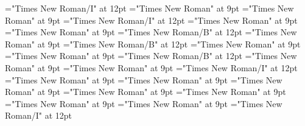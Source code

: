 \documentclass[gps1,twoside]{article}
\begin{document}
\font\spanenownertypeabbreviationminimallexreferenceminimallexreferencessubentrysubentriesentry="Times New Roman/I" at 12pt
\font\spanspanownertypeabbreviationminimallexreferenceminimallexreferencessubentrysubentriesentrybefore="Times New Roman" at 9pt
\font\spanownertypeabbreviationminimallexreferenceminimallexreferencessubentrysubentriesentrylastchildafter="Times New Roman" at 9pt
\font\spanownertypeabbreviationminimallexreferenceminimallexreferencessubentrysubentriesentry="Times New Roman/I" at 12pt
\font\configtargetconfigtargetconfigtargetsminimallexreferenceminimallexreferencessubentrysubentriesentrybefore="Times New Roman" at 9pt
\font\configtargetsminimallexreferenceminimallexreferencessubentrysubentriesentryafter="Times New Roman" at 9pt
\font\spanbzhheadwordconfigtargetconfigtargetsminimallexreferenceminimallexreferencessubentrysubentriesentry="Times New Roman/B" at 12pt
\font\spanspanheadwordconfigtargetconfigtargetsminimallexreferenceminimallexreferencessubentrysubentriesentrybefore="Times New Roman" at 9pt
\font\spanheadwordconfigtargetconfigtargetsminimallexreferenceminimallexreferencessubentrysubentriesentry="Times New Roman/B" at 12pt
\font\spanspansensecontentspansensessubentrysubentriesentrybefore="Times New Roman" at 9pt
\font\sensessubentrysubentriesentryafter="Times New Roman" at 9pt
\font\sensenumbersensecontentsensessubentrysubentriesentry="Times New Roman/B" at 12pt
\font\sensenumbersensecontentsensessubentrysubentriesentryafter="Times New Roman" at 9pt
\font\morphosyntaxanalysissharedgrammaticalinfosensessubentrysubentriesentryafter="Times New Roman" at 9pt
\font\morphosyntaxanalysissharedgrammaticalinfosensessubentrysubentriesentry="Times New Roman/I" at 12pt
\font\spanspanpartofspeechmorphosyntaxanalysissharedgrammaticalinfosensessubentrysubentriesentrybefore="Times New Roman" at 9pt
\font\spanpartofspeechmorphosyntaxanalysissharedgrammaticalinfosensessubentrysubentriesentrylastchildafter="Times New Roman" at 9pt
\font\spanspanslotsmorphosyntaxanalysissharedgrammaticalinfosensessubentrysubentriesentrybefore="Times New Roman" at 9pt
\font\slotsmorphosyntaxanalysissharedgrammaticalinfosensessubentrysubentriesentrybefore="Times New Roman" at 9pt
\font\spanspannameslotslotsmorphosyntaxanalysissharedgrammaticalinfosensessubentrysubentriesentrybefore="Times New Roman" at 9pt
\font\spannameslotslotsmorphosyntaxanalysissharedgrammaticalinfosensessubentrysubentriesentrylastchildafter="Times New Roman" at 9pt
\font\morphosyntaxanalysissensesensessubentrysubentriesentryafter="Times New Roman" at 9pt
\font\morphosyntaxanalysissensesensessubentrysubentriesentry="Times New Roman/I" at 12pt
\end{document}
